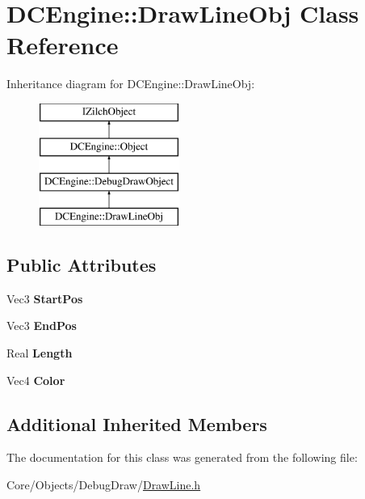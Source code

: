 \hypertarget{classDCEngine_1_1DrawLineObj}{\section{D\-C\-Engine\-:\-:Draw\-Line\-Obj Class Reference}
\label{classDCEngine_1_1DrawLineObj}
}
Inheritance diagram for D\-C\-Engine\-:\-:Draw\-Line\-Obj\-:\begin{figure}[H]
\begin{center}
\leavevmode
\includegraphics[height=4.000000cm]{classDCEngine_1_1DrawLineObj}
\end{center}
\end{figure}
\subsection*{Public Attributes}
\begin{DoxyCompactItemize}
\item 
\hypertarget{classDCEngine_1_1DrawLineObj_aeed7472194b1a3a970b7bda53cccffb3}{Vec3 {\bfseries Start\-Pos}}\label{classDCEngine_1_1DrawLineObj_aeed7472194b1a3a970b7bda53cccffb3}

\item 
\hypertarget{classDCEngine_1_1DrawLineObj_a601d52b836d18c4dc77d2eb9cdad75bf}{Vec3 {\bfseries End\-Pos}}\label{classDCEngine_1_1DrawLineObj_a601d52b836d18c4dc77d2eb9cdad75bf}

\item 
\hypertarget{classDCEngine_1_1DrawLineObj_aa54282be4d93fd2bea3dde107c124b54}{Real {\bfseries Length}}\label{classDCEngine_1_1DrawLineObj_aa54282be4d93fd2bea3dde107c124b54}

\item 
\hypertarget{classDCEngine_1_1DrawLineObj_adb67601ab8da8e333db65ba67964f69f}{Vec4 {\bfseries Color}}\label{classDCEngine_1_1DrawLineObj_adb67601ab8da8e333db65ba67964f69f}

\end{DoxyCompactItemize}
\subsection*{Additional Inherited Members}


The documentation for this class was generated from the following file\-:\begin{DoxyCompactItemize}
\item 
Core/\-Objects/\-Debug\-Draw/\hyperlink{DrawLine_8h}{Draw\-Line.\-h}\end{DoxyCompactItemize}
